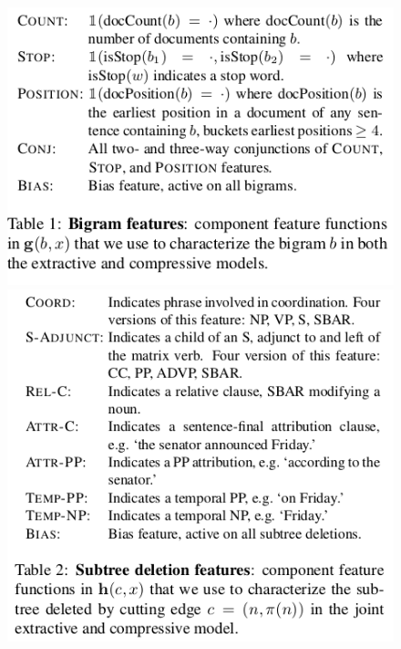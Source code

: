 \documentclass[xcolor={table}]{beamer}
\begin{document}
\begin{frame}[t]{\cite{berg2011jointly}}
      \begin{figure}[h]
          \centering
      \includegraphics[scale=.27]{images/table1-bergkirkpatrick11.png} 
      \includegraphics[scale=.27]{images/table2-bergkirkpatrick11.png} \\
  \end{figure}
\end{frame}
\end{document}
